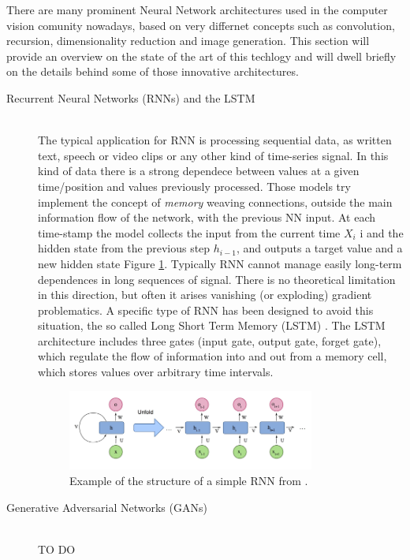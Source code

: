 There are many prominent Neural Network architectures used in the computer vision comunity nowadays, based on very differnet concepts such as convolution, recursion, dimensionality reduction and image generation. This section will provide an overview on the state of the art of this techlogy and will dwell briefly on the details behind some of those innovative architectures.

\begin{description}
    \item [Recurrent Neural Networks (RNNs) and the LSTM] \hfill \\
        The typical application for RNN is processing sequential data, as written text, speech or video clips or any other kind of time-series signal. In this kind of data there is a strong dependece between values at a given time/position and values previously processed. Those models try implement the concept of \textit{memory} weaving connections, outside the main information flow of the network, with the previous NN input. At each time-stamp the model collects the input from the current time $X_i$ i and the hidden state from the previous step $h_{i-1}$, and outputs a target value and a new hidden state Figure \ref{fig:recNN}. Typically RNN cannot manage easily long-term dependences in long sequences of signal. There is no theoretical limitation in this direction, but often it arises vanishing (or exploding) gradient problematics. A specific type of RNN has been designed to avoid this situation, the so called Long Short Term Memory (LSTM) \cite{LSTM}. The LSTM architecture includes three gates (input gate, output gate, forget gate), which regulate the flow of information into and out from a memory cell, which stores values over arbitrary time intervals.

        \begin{figure}
            \centering
            \includegraphics[width = 0.8\textwidth]{images/recNN}
            \caption{Example of the structure of a simple RNN from  \cite{deep_seg_SOA}.}
            \label{fig:recNN}
        \end{figure}

    \item [Generative Adversarial Networks (GANs)] \hfill \\
        TO DO


\end{description}
